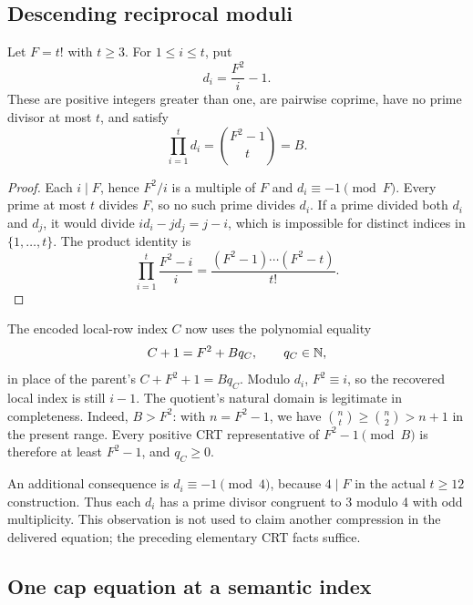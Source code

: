 \subsection{Descending reciprocal moduli}

\begin{lemma}\label{lem:descending-crt}
Let \(F=t!\) with \(t\ge3\). For \(1\le i\le t\), put
\[
 d_i=\frac{F^2}{i}-1.
\]
These are positive integers greater than one, are pairwise coprime,
have no prime divisor at most \(t\), and satisfy
\[
 \prod_{i=1}^{t}d_i=\binom{F^2-1}{t}=B.
\]
\end{lemma}

\begin{proof}
Each \(i\mid F\), hence \(F^2/i\) is a multiple of \(F\) and
\(d_i\equiv-1\pmod F\). Every prime at most \(t\) divides \(F\),
so no such prime divides \(d_i\). If a prime divided both \(d_i\)
and \(d_j\), it would divide
\(i d_i-jd_j=j-i\), which is impossible for distinct indices in
\(\{1,\ldots,t\}\). The product identity is
\[
 \prod_{i=1}^{t}\frac{F^2-i}{i}
 =\frac{(F^2-1)\cdots(F^2-t)}{t!}.
\]
\end{proof}

The encoded local-row index \(C\) now uses the polynomial equality
\begin{equation}\label{eq:descending-index}
 C+1=F^2+Bq_C,\qquad q_C\in\mathbb N,
\end{equation}
in place of the parent's \(C+F^2+1=Bq_C\). Modulo \(d_i\),
\(F^2\equiv i\), so the recovered local index is still \(i-1\).
The quotient's natural domain is legitimate in completeness. Indeed,
\(B>F^2\): with \(n=F^2-1\), we have
\(\binom nt\ge\binom n2>n+1\) in the present range. Every positive
CRT representative of \(F^2-1\pmod B\) is therefore at least
\(F^2-1\), and \(q_C\ge0\).

An additional consequence is \(d_i\equiv-1\pmod4\), because
\(4\mid F\) in the actual \(t\ge12\) construction. Thus each
\(d_i\) has a prime divisor congruent to 3 modulo 4 with odd
multiplicity. This observation is not used to claim another compression
in the delivered equation; the preceding elementary CRT facts suffice.

\subsection{One cap equation at a semantic index}

